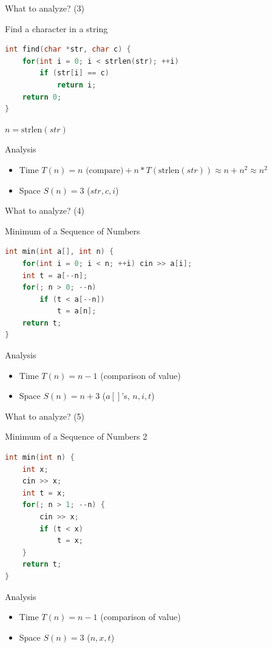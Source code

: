 \documentclass[aspectratio=169, xcolor=dvipsnames]{beamer}
\begin{document}
\begin{frame}[fragile]{What to analyze? (3)}
    \begin{exampleblock}{Find a character in a string}
\begin{lstlisting}[language=C++]
int find(char *str, char c) { 
    for(int i = 0; i < strlen(str); ++i) 
        if (str[i] == c) 
            return i; 
    return 0;
}
\end{lstlisting}
        $n = \text{strlen}(str)$
    \end{exampleblock}
    \begin{alertblock}{Analysis}
        \begin{itemize}[<+->]
            \item Time $T(n) = n \text{ (compare)} + n * T(\text{strlen}(str)) \approx n + n^2 \approx n^2$
            \item Space $S(n) = 3$ ($str, c, i$)
        \end{itemize}
    \end{alertblock}
\end{frame}

\begin{frame}[fragile]{What to analyze? (4)}
    \begin{exampleblock}{Minimum of a Sequence of Numbers}
\begin{lstlisting}[language=C++]
int min(int a[], int n) { 
    for(int i = 0; i < n; ++i) cin >> a[i];
    int t = a[--n];
    for(; n > 0; --n)
        if (t < a[--n])
            t = a[n];
    return t;
}
\end{lstlisting}
    \end{exampleblock}
    \begin{alertblock}{Analysis}
        \begin{itemize}[<+->]
            \item Time $T(n) = n - 1$ (comparison of value)
            \item Space $S(n) = n + 3$ ($a[]$'s, $n, i, t$)
        \end{itemize}
    \end{alertblock}
\end{frame}

\begin{frame}[fragile]{What to analyze? (5)}
    \begin{exampleblock}{Minimum of a Sequence of Numbers 2}
\begin{lstlisting}[language=C++]
int min(int n) {
    int x;
    cin >> x;
    int t = x;
    for(; n > 1; --n) {
        cin >> x;
        if (t < x)
            t = x;
    }
    return t;
}
\end{lstlisting}
    \end{exampleblock}
    \begin{alertblock}{Analysis}
        \begin{itemize}[<+->]
            \item Time $T(n) = n - 1$ (comparison of value)
            \item Space $S(n) = 3$ ($n, x, t$)
        \end{itemize}
    \end{alertblock}
\end{frame}
\end{document}
